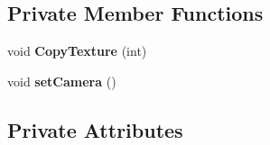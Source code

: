 \subsection*{Private Member Functions}
\begin{DoxyCompactItemize}
\item 
void {\bfseries Copy\+Texture} (int)\hypertarget{class_cubemap_renderer_a7e8ccc9174fca56e9fe8ed7c92f912ff}{}\label{class_cubemap_renderer_a7e8ccc9174fca56e9fe8ed7c92f912ff}

\item 
void {\bfseries set\+Camera} ()\hypertarget{class_cubemap_renderer_a3c52ed27dbb4a9397be805b8add53c4b}{}\label{class_cubemap_renderer_a3c52ed27dbb4a9397be805b8add53c4b}

\end{DoxyCompactItemize}
\subsection*{Private Attributes}
